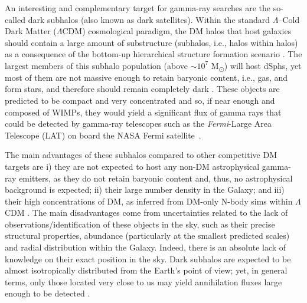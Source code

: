 \documentclass[%
 reprint,
nofootinbib,
 amsmath,amssymb,
 aps,
]{revtex4-2}
\begin{document}
An interesting and complementary target for gamma-ray searches are the so-called dark subhalos (also known as dark satellites). Within the standard $\Lambda$--Cold Dark Matter ($\Lambda$CDM) cosmological paradigm, the DM halos that host galaxies should contain a large amount of substructure (subhalos, i.e., halos within halos) as a consequence of the bottom-up hierarchical structure formation scenario \cite{Madau2008}. The largest members of this subhalo population (above $\sim10^{7}$ M\textsubscript{\(\odot\)}) will host dSphs, yet most of them are not massive enough to retain baryonic content, i.e., gas, and form stars, and therefore should remain completely dark \cite{Walker13,Sawala_2015}. These objects are predicted to be compact and very concentrated and so, if near enough and composed of WIMPs, they would yield a significant flux of gamma rays that could be detected by gamma-ray telescopes such as the \textit{Fermi}-Large Area Telescope (LAT) on board the NASA Fermi satellite~\cite{fermi_instrument_paper}.

The main advantages of these subhalos compared to other competitive DM targets are i) they are not expected to host any non-DM astrophysical gamma-ray emitters, as they do not retain baryonic content and, thus, no astrophysical background is expected; ii) their large number density in the Galaxy; and iii) their high concentrations of DM, as inferred from DM-only N-body sims within $\Lambda$CDM \cite{Diemand2008,Springel2008_nature,Moline+17}. The main disadvantages come from uncertainties related to the lack of observations/identification of these objects in the sky, such as their precise structural properties, abundance (particularly at the smallest predicted scales) and radial distribution within the Galaxy. Indeed, there is an absolute lack of knowledge on their exact position in the sky. Dark subhalos are expected to be almost isotropically distributed from the Earth's point of view; yet, in general terms, only those located very close to us may yield annihilation fluxes large enough to be detected \cite{CoronadoBlazquez2019a,hutten19b}.
\end{document}

